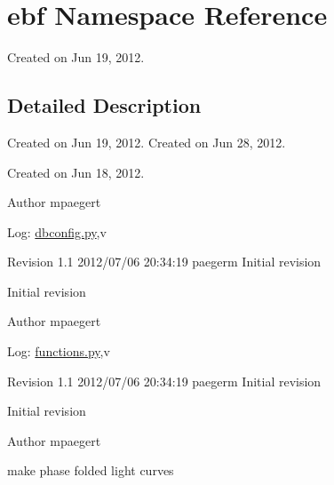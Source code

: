 \hypertarget{namespaceebf}{
\section{ebf Namespace Reference}
\label{namespaceebf}
}


Created on Jun 19, 2012.  




\subsection{Detailed Description}
Created on Jun 19, 2012. Created on Jun 28, 2012.

Created on Jun 18, 2012.

\begin{DoxyAuthor}{Author}
mpaegert 
\end{DoxyAuthor}
\begin{DoxyParagraph}{Log:}
\hyperlink{dbconfig_8py}{dbconfig.py},v 
\end{DoxyParagraph}
Revision 1.1 2012/07/06 20:34:19 paegerm Initial revision

Initial revision

\begin{DoxyAuthor}{Author}
mpaegert 
\end{DoxyAuthor}
\begin{DoxyParagraph}{Log:}
\hyperlink{functions_8py}{functions.py},v 
\end{DoxyParagraph}
Revision 1.1 2012/07/06 20:34:19 paegerm Initial revision

Initial revision

\begin{DoxyAuthor}{Author}
mpaegert 
\end{DoxyAuthor}
make phase folded light curves

